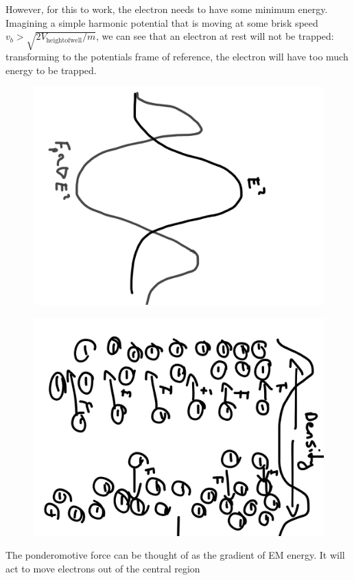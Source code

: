 \documentclass[12pt,letterpaper, titlepage]{article}
\begin{document}
However, for this to work, the electron needs to have some minimum energy.
Imagining a simple harmonic potential that is moving at some brisk speed $v_b >
\sqrt{2 V_\mathrm{height of well}/m} $, we can see that an electron at rest will
not be trapped: transforming to the potentials frame of reference, the electron
will have too much energy to be trapped.
\begin{marginfigure}
    \centering
    \begin{subfigure}[b]{.75\marginparwidth}
    \includegraphics[angle=90,width=\linewidth]{../figures/pondforce.png}
\end{subfigure}

\begin{subfigure}[b]{.75\marginparwidth}
    \includegraphics[width=\linewidth, angle=90]{../figures/ionback.png}
\end{subfigure}
\caption{The ponderomotive force can be thought of as the gradient of EM energy.
It will act to move electrons out of the central region}
\end{marginfigure}
\end{document}
